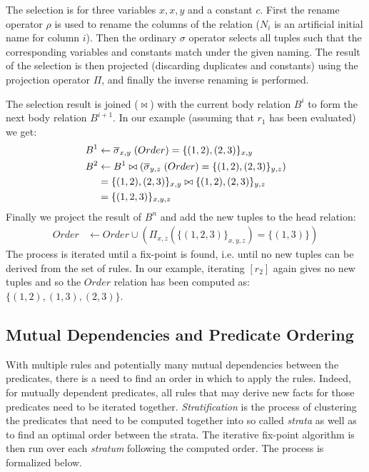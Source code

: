 The selection is for three variables $x, x, y$ and a constant $c$. First the rename operator $\rho$ is used to rename the columns of the relation ($N_i$ is an artificial initial name for column $i$). Then the ordinary $\sigma$ operator selects all tuples such that the corresponding variables and constants match under the given naming. The result of the selection is then projected (discarding duplicates and constants) using the projection operator $\Pi$, and finally the inverse renaming is performed.

The selection result is joined ($\bowtie$) with the current body relation $B^{i}$ to form the next body relation $B^{i + 1}$. In our example (assuming that $r_1$ has been evaluated) we get:
\begin{align*}
B^{1} &\leftarrow \overline{\sigma}_{x, y}\;(Order) = \{(1, 2), (2, 3)\}_{x, y}\\
B^{2} &\leftarrow B^{1} \bowtie (\overline{\sigma}_{y, z}\;(Order) = \{(1, 2), (2, 3)\}_{y, z})\\
      &= \{(1, 2), (2, 3)\}_{x, y} \bowtie \{(1, 2), (2, 3)\}_{y, z}\\
      &= \{(1,2,3)\}_{x,y,z}
\end{align*}
\noindent
Finally we project the result of $B^n$ and add the new tuples to the head relation:
\begin{align*}
Order & \leftarrow Order \cup (\Pi_{x,z}(\{(1,2,3)\}_{x,y,z}) = \{(1,3)\})
\end{align*}
\noindent
The process is iterated until a fix-point is found, i.e. until no new tuples can be derived from the set of rules. In our example, iterating $[r_2]$ again gives no new tuples and so the $Order$ relation has been computed as: $\{(1,2), (1,3), (2,3) \}$.

\subsection{Mutual Dependencies and Predicate Ordering}
With multiple rules and potentially many mutual dependencies between the predicates, there is a need to find an order in which to apply the rules. Indeed, for mutually dependent predicates, all rules that may derive new facts for those predicates need to be iterated together. \textit{Stratification}\cite{Green:2013:DRQ:2688167.2688168} is the process of clustering the predicates that need to be computed together into so called \textit{strata} as well as to find an optimal order between the strata. The iterative fix-point algorithm is then run over each \textit{stratum} following the computed order. The process is formalized below.

